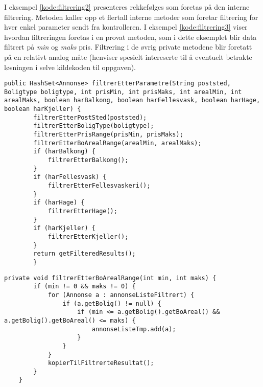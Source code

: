 I eksempel \ref{kode:filtrering2} presenteres rekkefølges som foretas på den interne filtrering. Metoden kaller opp et flertall interne metoder som foretar filtrering for hver enkel parameter sendt fra kontrolleren. I eksempel \ref{kode:filtrering3} viser hvordan filtreringen foretas i en provat metoden, som i dette eksemplet blir data filtrert på \textit{min} og \textit{maks} pris. Filtrering i de øvrig private metodene blir foretatt på en relativt analog måte (henviser spesielt intereserte til å eventuelt betrakte løsningen i selve kildekoden til oppgaven). 

\begin{lstlisting}[caption=AnnonseFilter.java: Filtreringsrekkefølge etter mottatte parametre, label=kode:filtrering2]
	public HashSet<Annonse> filtrerEtterParametre(String poststed, Boligtype boligtype, int prisMin, int prisMaks, int arealMin, int arealMaks, boolean harBalkong, boolean harFellesvask, boolean harHage, boolean harKjeller) {
        filtrerEtterPostSted(poststed);
        filtrerEtterBoligType(boligtype);
        filtrerEtterPrisRange(prisMin, prisMaks);
        filtrerEtterBoArealRange(arealMin, arealMaks);
        if (harBalkong) {
            filtrerEtterBalkong();
        }
        if (harFellesvask) {
            filtrerEtterFellesvaskeri();
        }
        if (harHage) {
            filtrerEtterHage();
        }
        if (harKjeller) {
            filtrerEtterKjeller();
        }
        return getFilteredResults();
    	}
\end{lstlisting}
    
\begin{lstlisting}[caption=AnnonseFilter.java: Eksepel på privat filtreringsklasse etter bolig areal som foretas mellom trinn for pris og balkong., label=kode:filtrering3]
    private void filtrerEtterBoArealRange(int min, int maks) {
        if (min != 0 && maks != 0) {
            for (Annonse a : annonseListeFiltrert) {
                if (a.getBolig() != null) {
                    if (min <= a.getBolig().getBoAreal() && a.getBolig().getBoAreal() <= maks) {
                        annonseListeTmp.add(a);
                    }
                }
            }
            kopierTilFiltrerteResultat();
        }
    }
\end{lstlisting}